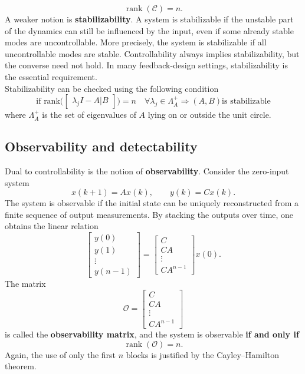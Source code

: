 \[
\operatorname{rank}(\mathcal{C}) = n.
\]
A weaker notion is \textbf{stabilizability}. A system is stabilizable if the unstable part of the dynamics can still be influenced by the input, even if some already stable modes are uncontrollable. More precisely, the system is stabilizable if all uncontrollable modes are stable. Controllability always implies stabilizability, but the converse need not hold. In many feedback-design settings, stabilizability is the essential requirement.\\
Stabilizability can be checked using the following condition
$$\text{if rank} \biggl(\begin{bmatrix}\lambda_j I - A |B \end{bmatrix}\biggr) = n \quad \forall \lambda_j \in \Lambda_A^+ \Rightarrow (A,B) \text{is stabilizable}$$
where $\Lambda_A^+$ is the set of eigenvalues of $A$ lying on or outside the unit circle.
\subsection{Observability and detectability}

Dual to controllability is the notion of \textbf{observability}. Consider the zero-input system
\[
x(k+1)=Ax(k), \qquad y(k)=Cx(k).
\]
The system is observable if the initial state can be uniquely reconstructed from a finite sequence of output measurements. By stacking the outputs over time, one obtains the linear relation
\[
\begin{bmatrix}
y(0)\\ y(1)\\ \vdots\\ y(n-1)
\end{bmatrix}
=
\begin{bmatrix}
C\\ CA\\ \vdots\\ CA^{n-1}
\end{bmatrix}x(0).
\]
The matrix
\[
\mathcal{O}=
\begin{bmatrix}
C\\ CA\\ \vdots\\ CA^{n-1}
\end{bmatrix}
\]
is called the \textbf{observability matrix}, and the system is observable \textbf{if and only if}
\[
\operatorname{rank}(\mathcal{O})=n.
\]
Again, the use of only the first $n$ blocks is justified by the Cayley--Hamilton theorem.\\

